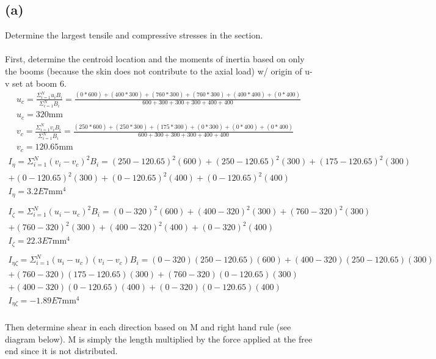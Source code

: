 \documentclass[12 pt]{article}
\begin{document}
\subsection*{(a)}
Determine the largest tensile and compressive stresses in the section. \\ \\
First, determine the centroid location and the moments of inertia based on only the booms (because the skin does not
contribute to the axial load) w/ origin of u-v set at boom 6. \\
\begin{align*}
    u_c=\frac{\Sigma_{i=1}^{N}u_iB_i}{\Sigma_{i=1}^{N}B_i}=\frac{(0*600)+(400*300)+(760*300)+(760*300)+(400*400)+(0*400)}
    {600+300+300+300+400+400} \\
    u_c=320\textrm{mm} \\
    v_c=\frac{\Sigma_{i=1}^{N}v_iB_i}{\Sigma_{i=1}^{N}B_i}=\frac{(250*600)+(250*300)+(175*300)+(0*300)+(0*400)+(0*400)}
    {600+300+300+300+400+400} \\
    v_c=120.65\textrm{mm}
\end{align*}
\begin{align*}
    I_{\eta}=\Sigma_{i=1}^{N}(v_i-v_c)^2B_i=(250-120.65)^2(600)+(250-120.65)^2(300)+(175-120.65)^2(300) \\
    +(0-120.65)^2(300)
    +(0-120.65)^2(400)+(0-120.65)^2(400) \\
    I_{\eta}=3.2E7 \textrm{mm}^4 \\ \\
    I_{\zeta}=\Sigma_{i=1}^{N}(u_i-u_c)^2B_i=(0-320)^2(600)+(400-320)^2(300)+(760-320)^2(300) \\
    +(760-320)^2(300)+(400-320)^2(400)+(0-320)^2(400) \\
    I_{\zeta}= 22.3E7 \textrm{mm}^4 \\ \\
    I_{\eta\zeta}=\Sigma_{i=1}^{N}(u_i-u_c)(v_i-v_c)B_i=(0-320)(250-120.65)(600)+(400-320)(250-120.65)(300) \\
    +(760-320)(175-120.65)(300)+(760-320)(0-120.65)(300) \\
    +(400-320)(0-120.65)(400)+(0-320)(0-120.65)(400) \\
    I_{\eta\zeta}=-1.89E7 \textrm{mm}^4
\end{align*} \\
Then determine shear in each direction based on M and right hand rule (see diagram below). M is simply the length
multiplied by the force applied at the free end since it is not distributed. \\
\end{document}

